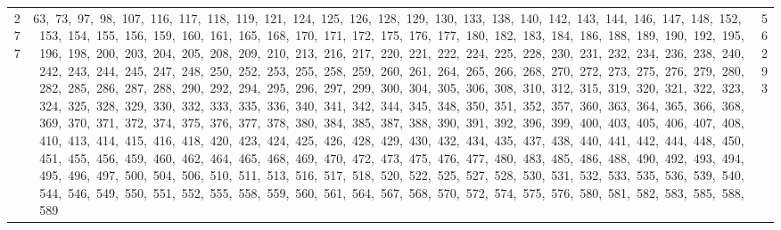 \begin{longtable}{c|p{}|r}
277 & 63,\ 73,\ 97,\ 98,\ 107,\ 116,\ 117,\ 118,\ 119,\ 121,\ 124,\ 125,\ 126,\ 128,\ 129,\ 130,\ 133,\ 138,\ 140,\ 142,\ 143,\ 144,\ 146,\ 147,\ 148,\ 152,\ 153,\ 154,\ 155,\ 156,\ 159,\ 160,\ 161,\ 165,\ 168,\ 170,\ 171,\ 172,\ 175,\ 176,\ 177,\ 180,\ 182,\ 183,\ 184,\ 186,\ 188,\ 189,\ 190,\ 192,\ 195,\ 196,\ 198,\ 200,\ 203,\ 204,\ 205,\ 208,\ 209,\ 210,\ 213,\ 216,\ 217,\ 220,\ 221,\ 222,\ 224,\ 225,\ 228,\ 230,\ 231,\ 232,\ 234,\ 236,\ 238,\ 240,\ 242,\ 243,\ 244,\ 245,\ 247,\ 248,\ 250,\ 252,\ 253,\ 255,\ 258,\ 259,\ 260,\ 261,\ 264,\ 265,\ 266,\ 268,\ 270,\ 272,\ 273,\ 275,\ 276,\ 279,\ 280,\ 282,\ 285,\ 286,\ 287,\ 288,\ 290,\ 292,\ 294,\ 295,\ 296,\ 297,\ 299,\ 300,\ 304,\ 305,\ 306,\ 308,\ 310,\ 312,\ 315,\ 319,\ 320,\ 321,\ 322,\ 323,\ 324,\ 325,\ 328,\ 329,\ 330,\ 332,\ 333,\ 335,\ 336,\ 340,\ 341,\ 342,\ 344,\ 345,\ 348,\ 350,\ 351,\ 352,\ 357,\ 360,\ 363,\ 364,\ 365,\ 366,\ 368,\ 369,\ 370,\ 371,\ 372,\ 374,\ 375,\ 376,\ 377,\ 378,\ 380,\ 384,\ 385,\ 387,\ 388,\ 390,\ 391,\ 392,\ 396,\ 399,\ 400,\ 403,\ 405,\ 406,\ 407,\ 408,\ 410,\ 413,\ 414,\ 415,\ 416,\ 418,\ 420,\ 423,\ 424,\ 425,\ 426,\ 428,\ 429,\ 430,\ 432,\ 434,\ 435,\ 437,\ 438,\ 440,\ 441,\ 442,\ 444,\ 448,\ 450,\ 451,\ 455,\ 456,\ 459,\ 460,\ 462,\ 464,\ 465,\ 468,\ 469,\ 470,\ 472,\ 473,\ 475,\ 476,\ 477,\ 480,\ 483,\ 485,\ 486,\ 488,\ 490,\ 492,\ 493,\ 494,\ 495,\ 496,\ 497,\ 500,\ 504,\ 506,\ 510,\ 511,\ 513,\ 516,\ 517,\ 518,\ 520,\ 522,\ 525,\ 527,\ 528,\ 530,\ 531,\ 532,\ 533,\ 535,\ 536,\ 539,\ 540,\ 544,\ 546,\ 549,\ 550,\ 551,\ 552,\ 555,\ 558,\ 559,\ 560,\ 561,\ 564,\ 567,\ 568,\ 570,\ 572,\ 574,\ 575,\ 576,\ 580,\ 581,\ 582,\ 583,\ 585,\ 588,\ 589 & 56293 \\

\end{longtable}
